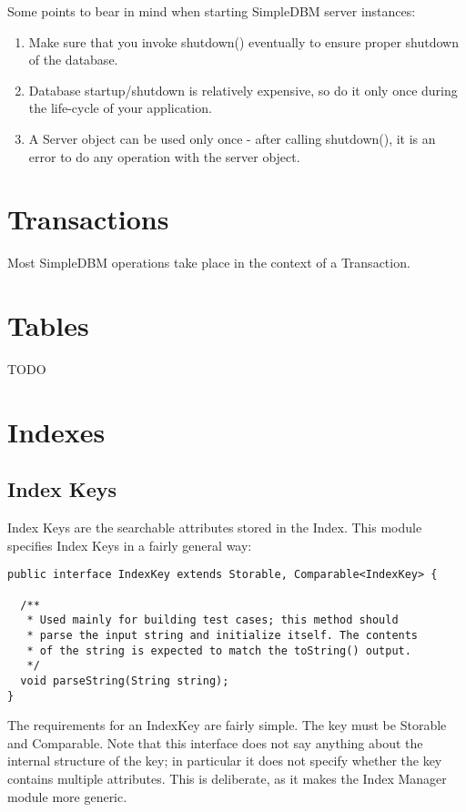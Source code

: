 \documentclass[a4paper,draft,oneside]{book}
\begin{document}
Some points to bear in mind when starting SimpleDBM server instances:

\begin{enumerate}
\item Make sure that you invoke shutdown() eventually to ensure proper
  shutdown of the database.
\item Database startup/shutdown is relatively expensive, so do it only
  once during the life-cycle of your application.
\item A Server object can be used only once - after calling
  shutdown(), it is an error to do any operation with the server
  object.
\end{enumerate}

\chapter{Transactions}

Most SimpleDBM operations take place in the context of a Transaction.

\chapter{Tables}

TODO

\chapter{Indexes}


\section{Index Keys}

Index Keys are the searchable attributes stored in the Index. This module
specifies Index Keys in a fairly general way:

\begin{verbatim}
public interface IndexKey extends Storable, Comparable<IndexKey> {
	
  /**
   * Used mainly for building test cases; this method should
   * parse the input string and initialize itself. The contents 
   * of the string is expected to match the toString() output.
   */
  void parseString(String string);
}
\end{verbatim}

The requirements for an IndexKey are fairly simple. The key must be
Storable and Comparable. Note that this interface does not say anything
about the internal structure of the key; in particular it does not 
specify whether the key contains multiple attributes. This is deliberate,
as it makes the Index Manager module more generic.
\end{document}
